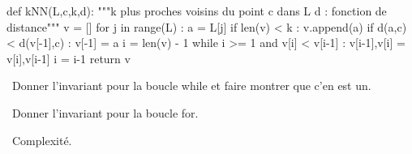 \begin{pyverbatim}[gobble=0,numbers=left]
def kNN(L,c,k,d):
    """k plus proches voisins du point c dans L
       d : fonction de distance"""
    v = []
    for j in range(L) :
        a = L[j]
        if len(v) < k : 
            v.append(a)
        if d(a,c) < d(v[-1],c) : 
            v[-1] = a
        i = len(v) - 1 
        while i >= 1 and v[i] < v[i-1] : 
            v[i-1],v[i] = v[i],v[i-1]
            i = i-1
    return v
\end{pyverbatim}

\medskip

\question\ Donner l'invariant pour la boucle while et faire montrer que c'en est un. 

\medskip

\question\ Donner l'invariant pour la boucle for. 

\medskip

\question\ Complexité. 